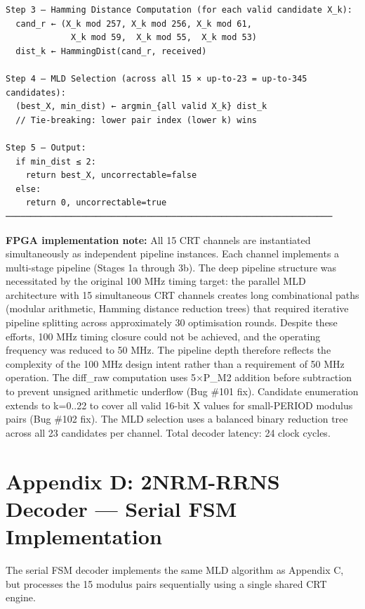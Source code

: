 \documentclass[
  english,
  12pt,
]{report}
\begin{document}
\begin{verbatim}
Step 3 — Hamming Distance Computation (for each valid candidate X_k):
  cand_r ← (X_k mod 257, X_k mod 256, X_k mod 61,
             X_k mod 59,  X_k mod 55,  X_k mod 53)
  dist_k ← HammingDist(cand_r, received)

Step 4 — MLD Selection (across all 15 × up-to-23 = up-to-345 candidates):
  (best_X, min_dist) ← argmin_{all valid X_k} dist_k
  // Tie-breaking: lower pair index (lower k) wins

Step 5 — Output:
  if min_dist ≤ 2:
    return best_X, uncorrectable=false
  else:
    return 0, uncorrectable=true
─────────────────────────────────────────────────────────────────
\end{verbatim}

\textbf{FPGA implementation note:} All 15 CRT channels are instantiated
simultaneously as independent pipeline instances. Each channel
implements a multi-stage pipeline (Stages 1a through 3b). The deep
pipeline structure was necessitated by the original 100 MHz timing
target: the parallel MLD architecture with 15 simultaneous CRT channels
creates long combinational paths (modular arithmetic, Hamming distance
reduction trees) that required iterative pipeline splitting across
approximately 30 optimisation rounds. Despite these efforts, 100 MHz
timing closure could not be achieved, and the operating frequency was
reduced to 50 MHz. The pipeline depth therefore reflects the complexity
of the 100 MHz design intent rather than a requirement of 50 MHz
operation. The diff\_raw computation uses 5×P\_M2 addition before
subtraction to prevent unsigned arithmetic underflow (Bug \#101 fix).
Candidate enumeration extends to k=0..22 to cover all valid 16-bit X
values for small-PERIOD modulus pairs (Bug \#102 fix). The MLD selection
uses a balanced binary reduction tree across all 23 candidates per
channel. Total decoder latency: 24 clock cycles.

\section{Appendix D: 2NRM-RRNS Decoder --- Serial FSM
Implementation}\label{appendix-d-2nrm-rrns-decoder-serial-fsm-implementation}

The serial FSM decoder implements the same MLD algorithm as Appendix C,
but processes the 15 modulus pairs sequentially using a single shared
CRT engine.
\end{document}
